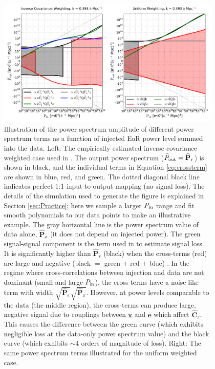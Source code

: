 \documentclass[preprint2,numberedappendix,tighten]{aastex6}  %
\begin{document}
\begin{figure}
	\centering
	\includegraphics[width=1\textwidth]{plots/sigloss_terms.pdf}
	\caption{Illustration of the power spectrum amplitude of different power spectrum terms as a function of injected EoR power level summed into the 
data. Left: The empirically estimated inverse covariance weighted case used in . The output power spectrum ($\widehat{P}_{\rm out}=\widehat{\textbf{P}}_r$) is shown in black, and the individual terms in Equation 
\eqref{eq:crossterm} are shown in blue, red, and green. The dotted diagonal black line indicates perfect 1:1 input-to-output mapping (no signal loss). The details of the simulation used to generate the figure is explained in Section 
\ref{sec:Practice}; here we sample a larger $P_{\rm in}$ range and fit smooth polynomials to our data points to make an illustrative example.  The gray 
horizontal line is the power spectrum value of data alone, $\widehat{\textbf{P}}_{x}$ (it does not depend on injected power). The green signal-signal 
component is the term used in  to estimate signal loss. It is significantly higher 
than $\widehat{\textbf{P}}_{r}$ (black) when the cross-terms (red) are large and negative (black $=$ green $+$ red $+$ blue) . In the 
regime where cross-correlations between injection and data are not dominant (small and large $P_{\rm in}$), the cross-terms have a noise-like 
term with width $\sqrt{\widehat{\textbf{P}}_e}\sqrt{\widehat{\textbf{P}}_x}$. However, at power levels comparable to the data (the middle region), the cross-terms can produce large, negative signal due to couplings between $\textbf{x}$ and $\textbf{e}$ which affect 
$\widehat{\textbf{C}}_{r}$. This causes the difference between the green curve (which exhibits negligible loss at 
the data-only power spectrum value) and the black curve (which exhibits $\sim4$ orders of magnitude of loss). Right: The same power spectrum terms illustrated for the uniform weighted case.}
	\label{fig:sigloss_terms}
\end{figure}
\end{document}
